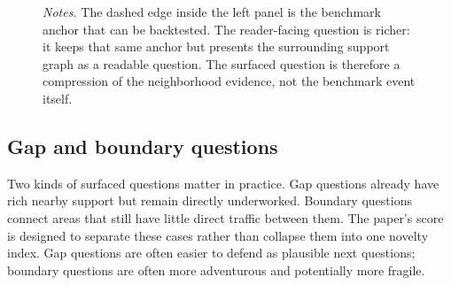 \documentclass[11pt]{article}
\newcommand{\fignotes}[1]{\caption*{\textit{Notes.} #1}}
\begin{document}
\begin{figure}[H]
  \fignotes{The dashed edge inside the left panel is the benchmark anchor that can be backtested. The reader-facing question is richer: it keeps that same anchor but presents the surrounding support graph as a readable question. The surfaced question is therefore a compression of the neighborhood evidence, not the benchmark event itself.}
\end{figure}

\subsection{Gap and boundary questions}

Two kinds of surfaced questions matter in practice. Gap questions already have rich nearby support but remain directly underworked. Boundary questions connect areas that still have little direct traffic between them. The paper's score is designed to separate these cases rather than collapse them into one novelty index. Gap questions are often easier to defend as plausible next questions; boundary questions are often more adventurous and potentially more fragile.
\end{document}
